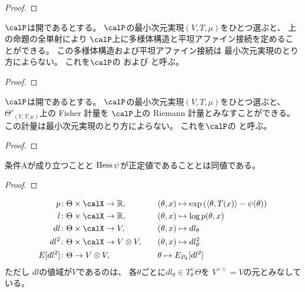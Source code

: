 \documentclass[report]{jlreq}
\begin{document}
\begin{proof}
    \TODO{}
\end{proof}

\begin{propdef}
    $\calP$は開であるとする。
    $\calP$の最小次元実現$(V, T, \mu)$をひとつ選ぶと、
    上の命題の全単射により
    $\calP$上に多様体構造と平坦アファイン接続を定めることができる。
    この多様体構造および平坦アファイン接続は
    最小次元実現のとり方によらない。
    これを$\calP$の
    および
    と呼ぶ。
\end{propdef}

\begin{proof}
\end{proof}

\begin{propdef}
    $\calP$は開であるとする。
    $\calP$の最小次元実現$(V, T, \mu)$をひとつ選ぶと、
    $\Theta'_{(V, T, \mu)}$上の Fisher 計量を
    $\calP$上の Riemann 計量とみなすことができる。
    この計量は最小次元実現のとり方によらない。
    これを$\calP$の
    と呼ぶ。
\end{propdef}

\begin{proof}
    \TODO{}
\end{proof}

\begin{proposition}
    条件Aが成り立つことと
    $\operatorname{Hess}\psi$が正定値であることとは同値である。
\end{proposition}

\begin{proof}
    \TODO{}
\end{proof}

\begin{definition}[スコア関数]
    \begin{alignat}{2}
        p
            &\colon \Theta \times \calX \to \R, \quad
            &&(\theta, x) \mapsto \exp\myparen{
                \langle \theta, T(x) \rangle - \psi(\theta)
            }
            \\
        l
            &\colon \Theta \times \calX \to \R, \quad
            &&(\theta, x) \mapsto \log p(\theta, x)
            \\
        dl
            &\colon \Theta \times \calX \to V, \quad
            &&(\theta, x) \mapsto dl_\theta
            \\
        dl^2
            &\colon \Theta \times \calX \to V \otimes V, \quad
            &&(\theta, x) \mapsto dl_\theta^2
            \\
        E[dl^2]
            &\colon \Theta \to V \otimes V, \quad
            &&\theta \mapsto E_{P_\theta}[dl^2]
    \end{alignat}
    ただし
    $dl$の値域が$V$であるのは、
    各$\theta$ごとに$dl_\theta \in T^\vee_\theta \Theta$を
    $V^{\vee\vee} = V$の元とみなしている。
\end{definition}
\end{document}
